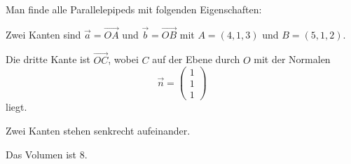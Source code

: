 \begin{beispiel}
Man finde alle Parallelepipeds mit folgenden Eigenschaften:
\begin{compactenum}
\item Zwei Kanten sind $\vec a=\overrightarrow{OA}$ und $\vec b=\overrightarrow{OB}$
mit $A=(4,1,3)$ und $B=(5,1,2)$.
\item Die dritte Kante ist $\overrightarrow{OC}$, wobei $C$ auf der
Ebene durch $O$ mit der Normalen
\[
\vec n=\begin{pmatrix}1\\1\\1\end{pmatrix}
\]
liegt.
\item Zwei Kanten stehen senkrecht aufeinander.
\item Das Volumen ist $8$.
\end{compactenum}

\smallskip


\end{beispiel}
